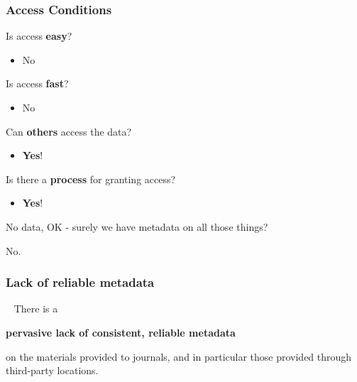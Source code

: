 \begin{frame}
\frametitle{Access Conditions}
\begin{block}{Is access \textbf{easy}?}
\begin{itemize}	\item No\end{itemize}
\end{block}\pause
\begin{block}{Is access \textbf{fast}?}
	\begin{itemize}	\item No\end{itemize}
\end{block}\pause
\begin{block}{Can \textbf{others} access the data?}
	\begin{itemize}	\item \textbf{Yes}!\end{itemize}
\end{block}
\begin{block}{Is there a \textbf{process} for granting access?}
	\begin{itemize}	\item \textbf{Yes}!\end{itemize}
\end{block}
\end{frame}





\begin{frame}
\begin{center}
\huge	No data, OK - surely we have  metadata on all those things?
\end{center}
\end{frame}


\begin{frame}
\begin{center}
	\huge	No.
\end{center}
\end{frame}



\begin{frame}
\frametitle{Lack of reliable metadata}
\begin{block}{\ }
	\large
 There is a 
 \begin{center}
 	\textbf{pervasive lack of consistent, reliable metadata} 
 \end{center}
on the materials provided to journals, and in particular those provided through third-party locations.
\end{block}
\end{frame}



